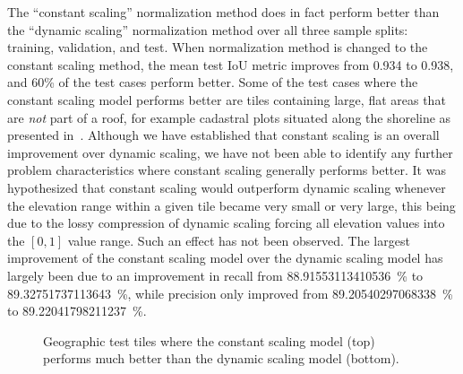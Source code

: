 The \enquote{constant scaling} normalization method does in fact perform better than the \enquote{dynamic scaling} normalization method over all three sample splits: training, validation, and test.
When normalization method is changed to the constant scaling method, the mean test IoU metric improves from \num{0.934} to \num{0.938}, and 60\% of the test cases perform better.
Some of the test cases where the constant scaling model performs better are tiles containing large, flat areas that are \emph{not} part of a roof, for example cadastral plots situated along the shoreline as presented in~.
Although we have established that constant scaling is an overall improvement over dynamic scaling, we have not been able to identify any further problem characteristics where constant scaling generally performs better.
It was hypothesized that constant scaling would outperform dynamic scaling whenever the elevation range within a given tile became very small or very large, this being due to the lossy compression of dynamic scaling forcing all elevation values into the $[0, 1]$ value range.
Such an effect has not been observed.
The largest improvement of the constant scaling model over the dynamic scaling model has largely been due to an improvement in recall from \SI[round-mode=places,round-precision=2]{88.91553113410536}{\percent} to \SI[round-mode=places,round-precision=2]{89.32751737113643}{\percent}, while precision only improved from \SI[round-mode=places,round-precision=2]{89.20540297068338}{\percent} to \SI[round-mode=places,round-precision=2]{89.22041798211237}{\percent}.

\begin{figure}[H]
  \centering
  \caption{%
    Geographic test tiles where the constant scaling model (top) performs much better than the dynamic scaling model (bottom).
  }%
  \label{fig:constant-better-than-dynamic}
\end{figure}
